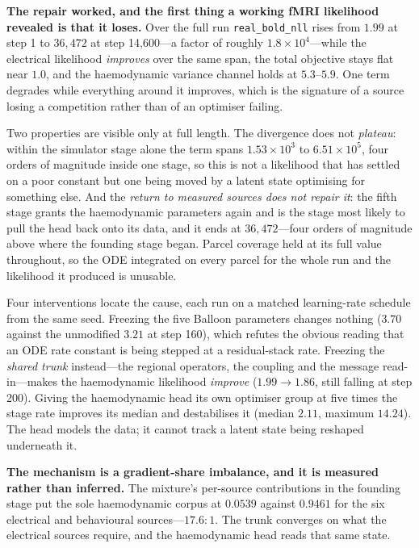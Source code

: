 \textbf{The repair worked, and the first thing a working fMRI likelihood revealed
is that it loses.} Over the full run \texttt{real\_bold\_nll} rises from \(1.99\)
at step 1 to \(36{,}472\) at step 14{,}600---a factor of roughly \(1.8 \times
10^{4}\)---while the electrical likelihood \emph{improves} over the same span, the
total objective stays flat near \(1.0\), and the haemodynamic variance channel
holds at \(5.3\)--\(5.9\). One term degrades while everything around it improves,
which is the signature of a source losing a competition rather than of an
optimiser failing.

Two properties are visible only at full length. The divergence does not
\emph{plateau}: within the simulator stage alone the term spans \(1.53 \times
10^{3}\) to \(6.51 \times 10^{5}\), four orders of magnitude inside one stage, so
this is not a likelihood that has settled on a poor constant but one being moved
by a latent state optimising for something else. And the \emph{return to measured
sources does not repair it}: the fifth stage grants the haemodynamic parameters
again and is the stage most likely to pull the head back onto its data, and it
ends at \(36{,}472\)---four orders of magnitude above where the founding stage
began. Parcel coverage held at its full value throughout, so the ODE integrated
on every parcel for the whole run and the likelihood it produced is unusable.

Four interventions locate the cause, each run on a matched learning-rate schedule
from the same seed. Freezing the five Balloon parameters changes nothing
(\(3.70\) against the unmodified \(3.21\) at step 160), which refutes the obvious
reading that an ODE rate constant is being stepped at a residual-stack rate.
Freezing the \emph{shared trunk} instead---the regional operators, the coupling
and the message read-in---makes the haemodynamic likelihood \emph{improve}
(\(1.99 \to 1.86\), still falling at step 200). Giving the haemodynamic head its
own optimiser group at five times the stage rate improves its median and
destabilises it (median \(2.11\), maximum \(14.24\)). The head models the data;
it cannot track a latent state being reshaped underneath it.

\textbf{The mechanism is a gradient-share imbalance, and it is measured rather
than inferred.} The mixture's per-source contributions in the founding stage put
the sole haemodynamic corpus at \(0.0539\) against \(0.9461\) for the six
electrical and behavioural sources---\(17.6\!:\!1\). The trunk converges on what
the electrical sources require, and the haemodynamic head reads that same state.

